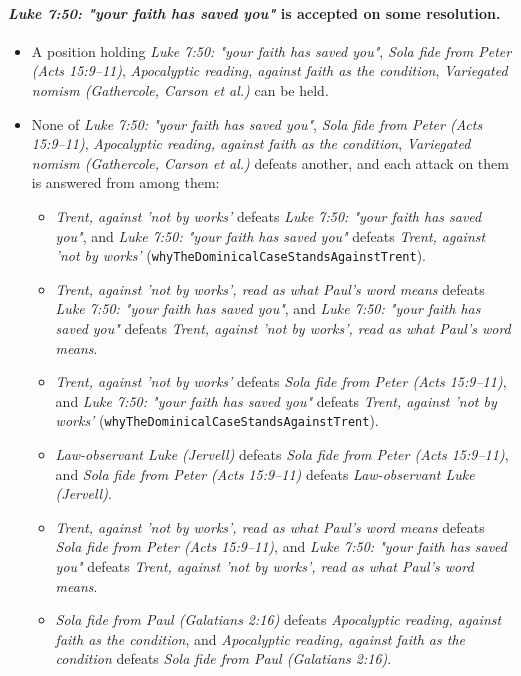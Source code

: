 \documentclass[11pt]{article}
\begin{document}
\paragraph{\emph{Luke 7:50: "your faith has saved you"} is accepted on some resolution.}
\begin{itemize}
\item A position holding \emph{Luke 7:50: "your faith has saved you"}, \emph{Sola fide from Peter (Acts 15:9–11)}, \emph{Apocalyptic reading, against faith as the condition}, \emph{Variegated nomism (Gathercole, Carson et al.)} can be held.
\item None of \emph{Luke 7:50: "your faith has saved you"}, \emph{Sola fide from Peter (Acts 15:9–11)}, \emph{Apocalyptic reading, against faith as the condition}, \emph{Variegated nomism (Gathercole, Carson et al.)} defeats another, and each attack on them is answered from among them:
\begin{itemize}
\item \emph{Trent, against 'not by works'} defeats \emph{Luke 7:50: "your faith has saved you"}, and \emph{Luke 7:50: "your faith has saved you"} defeats \emph{Trent, against 'not by works'} (\texttt{why\allowbreak{}The\allowbreak{}Dominical\allowbreak{}Case\allowbreak{}Stands\allowbreak{}Against\allowbreak{}Trent}).
\item \emph{Trent, against 'not by works', read as what Paul's word means} defeats \emph{Luke 7:50: "your faith has saved you"}, and \emph{Luke 7:50: "your faith has saved you"} defeats \emph{Trent, against 'not by works', read as what Paul's word means}.
\item \emph{Trent, against 'not by works'} defeats \emph{Sola fide from Peter (Acts 15:9–11)}, and \emph{Luke 7:50: "your faith has saved you"} defeats \emph{Trent, against 'not by works'} (\texttt{why\allowbreak{}The\allowbreak{}Dominical\allowbreak{}Case\allowbreak{}Stands\allowbreak{}Against\allowbreak{}Trent}).
\item \emph{Law-observant Luke (Jervell)} defeats \emph{Sola fide from Peter (Acts 15:9–11)}, and \emph{Sola fide from Peter (Acts 15:9–11)} defeats \emph{Law-observant Luke (Jervell)}.
\item \emph{Trent, against 'not by works', read as what Paul's word means} defeats \emph{Sola fide from Peter (Acts 15:9–11)}, and \emph{Luke 7:50: "your faith has saved you"} defeats \emph{Trent, against 'not by works', read as what Paul's word means}.
\item \emph{Sola fide from Paul (Galatians 2:16)} defeats \emph{Apocalyptic reading, against faith as the condition}, and \emph{Apocalyptic reading, against faith as the condition} defeats \emph{Sola fide from Paul (Galatians 2:16)}.

\end{itemize}
\end{itemize}
\end{document}
